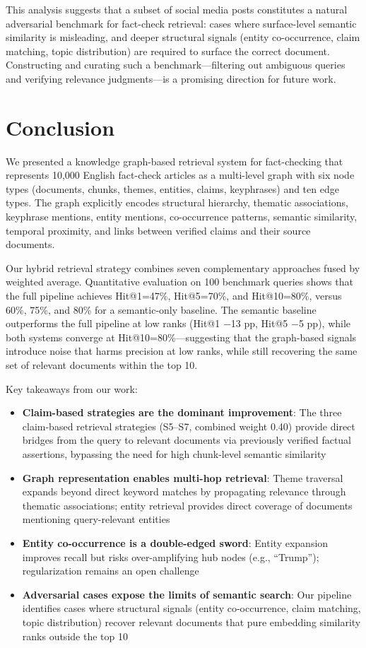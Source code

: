 \documentclass[10pt]{article}
\begin{document}
This analysis suggests that a subset of social media posts constitutes a natural adversarial benchmark for fact-check retrieval: cases where surface-level semantic similarity is misleading, and deeper structural signals (entity co-occurrence, claim matching, topic distribution) are required to surface the correct document. Constructing and curating such a benchmark---filtering out ambiguous queries and verifying relevance judgments---is a promising direction for future work.


\section{Conclusion}
\label{sec:conclusion}

We presented a knowledge graph-based retrieval system for fact-checking that represents 10,000 English fact-check articles as a multi-level graph with six node types (documents, chunks, themes, entities, claims, keyphrases) and ten edge types. The graph explicitly encodes structural hierarchy, thematic associations, keyphrase mentions, entity mentions, co-occurrence patterns, semantic similarity, temporal proximity, and links between verified claims and their source documents.

Our hybrid retrieval strategy combines seven complementary approaches fused by weighted average. Quantitative evaluation on 100 benchmark queries shows that the full pipeline achieves Hit@1=47\%, Hit@5=70\%, and Hit@10=80\%, versus 60\%, 75\%, and 80\% for a semantic-only baseline. The semantic baseline outperforms the full pipeline at low ranks (Hit@1 $-$13 pp, Hit@5 $-$5 pp), while both systems converge at Hit@10=80\%---suggesting that the graph-based signals introduce noise that harms precision at low ranks, while still recovering the same set of relevant documents within the top 10.


Key takeaways from our work:

\begin{itemize}[itemsep=2pt]
    \item \textbf{Claim-based strategies are the dominant improvement}: The three claim-based retrieval strategies (S5--S7, combined weight 0.40) provide direct bridges from the query to relevant documents via previously verified factual assertions, bypassing the need for high chunk-level semantic similarity
    \item \textbf{Graph representation enables multi-hop retrieval}: Theme traversal expands beyond direct keyword matches by propagating relevance through thematic associations; entity retrieval provides direct coverage of documents mentioning query-relevant entities
    \item \textbf{Entity co-occurrence is a double-edged sword}: Entity expansion improves recall but risks over-amplifying hub nodes (e.g., ``Trump''); regularization remains an open challenge
    \item \textbf{Adversarial cases expose the limits of semantic search}: Our pipeline identifies cases where structural signals (entity co-occurrence, claim matching, topic distribution) recover relevant documents that pure embedding similarity ranks outside the top 10
\end{itemize}
\end{document}
